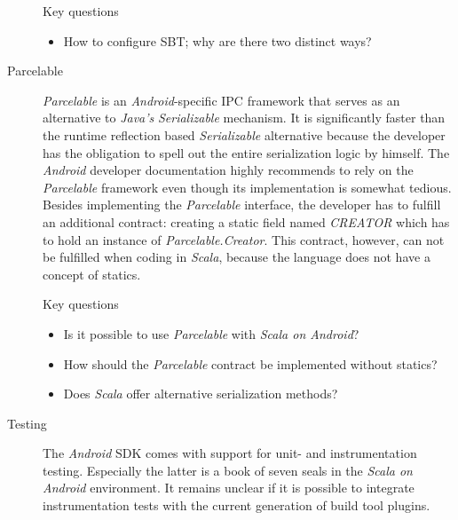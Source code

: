 \begin{description}
\begin{highlight}{Key questions}
\begin{itemize}
			\item How to configure \ac{SBT}; why are there two distinct ways?

		\end{itemize}

	\end{highlight}

	\item[Parcelable]\hfill

	\textit{Parcelable} is an \textit{Android}-specific \ac{IPC} framework that serves as an alternative to \textit{Java's} \textit{Serializable} mechanism. It is significantly faster than the runtime reflection based \textit{Serializable} alternative because the developer has the obligation to spell out the entire serialization logic by himself. The \textit{Android} developer documentation highly recommends to rely on the \textit{Parcelable} framework even though its implementation is somewhat tedious. Besides implementing the \textit{Parcelable} interface, the developer has to fulfill an additional contract: creating a static field named \textit{CREATOR} which has to hold an instance of \textit{Parcelable.Creator}. This contract, however, can not be fulfilled when coding in \textit{Scala}, because the language does not have a concept of statics.

	\begin{highlight}{Key questions}

		\begin{itemize}

			\item Is it possible to use \textit{Parcelable} with \textit{Scala on Android}?

			\item How should the \textit{Parcelable} contract be implemented without statics?

			\item Does \textit{Scala} offer alternative serialization methods?

		\end{itemize}

	\end{highlight}

	\item[Testing]\hfill

	The \textit{Android} \ac{SDK} comes with support for unit- and instrumentation testing. Especially the latter is a book of seven seals in the \textit{Scala on Android} environment. It remains unclear if it is possible to integrate instrumentation tests with the current generation of  build tool plugins.


\end{description}
